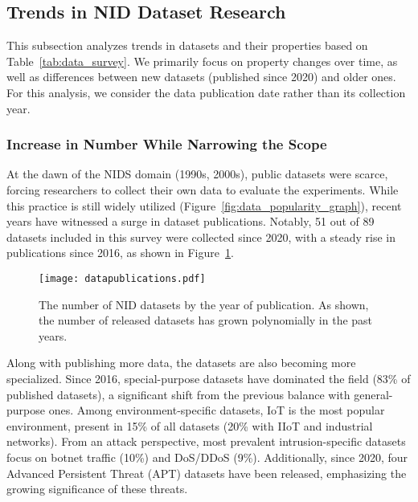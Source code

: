 \subsection{Trends in NID Dataset Research}
\label{ssec:ndatasurv_trends}

This subsection analyzes trends in datasets and their properties based on Table~\ref{tab:data_survey}. We primarily focus on property changes over time, as well as differences between new datasets (published since 2020) and older ones. For this analysis, we consider the data publication date rather than its collection year.

\subsubsection{Increase in Number While Narrowing the Scope}
\label{sssec:ndatasurv_trends_more_and_narrow}

At the dawn of the NIDS domain (1990s, 2000s), public datasets were scarce, forcing researchers to collect their own data to evaluate the experiments. While this practice is still widely utilized (Figure~\ref{fig:data_popularity_graph}), recent years have witnessed a surge in dataset publications. Notably, 51 out of 89 datasets included in this survey were collected since 2020, with a steady rise in publications since 2016, as shown in Figure~\ref{fig:data_publications_yearly}.

\begin{figure}[t]
    \centering
    \texttt{[image: datapublications.pdf]}
    \vspace*{-2em}
    \caption{The number of NID datasets by the year of publication. As shown, the number of released datasets has grown polynomially in the past years.}
    \label{fig:data_publications_yearly}
\end{figure}

Along with publishing more data, the datasets are also becoming more specialized. Since 2016, special-purpose datasets have dominated the field (83\% of published datasets), a significant shift from the previous balance with general-purpose ones. Among environment-specific datasets, IoT is the most popular environment, present in 15\% of all datasets (20\% with IIoT and industrial networks). From an attack perspective, most prevalent intrusion-specific datasets focus on botnet traffic (10\%) and DoS/DDoS (9\%). Additionally, since 2020, four Advanced Persistent Threat (APT) datasets have been released, emphasizing the growing significance of these threats. 


